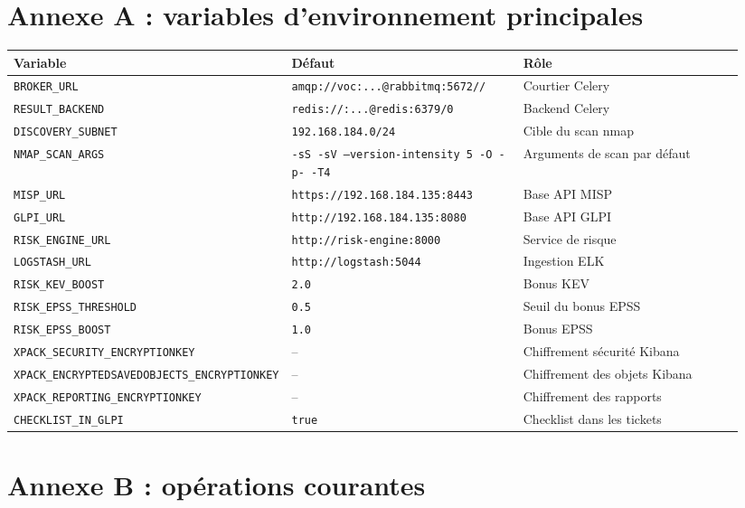 \section{Annexe A : variables d'environnement principales}

\begin{center}
\small
\begin{longtable}{@{}p{0.30\linewidth} p{0.32\linewidth} p{0.32\linewidth}@{}}
\toprule
\textbf{Variable} & \textbf{D\'efaut} & \textbf{R\^ole} \\
\midrule
\endhead
\bottomrule
\endlastfoot
\texttt{BROKER\_URL} & \texttt{amqp://voc:...@rabbitmq:5672//} & Courtier Celery \\
\texttt{RESULT\_BACKEND} & \texttt{redis://:...@redis:6379/0} & Backend Celery \\
\texttt{DISCOVERY\_SUBNET} & \texttt{192.168.184.0/24} & Cible du scan nmap \\
\texttt{NMAP\_SCAN\_ARGS} & \texttt{-sS -sV --version-intensity 5 -O -p- -T4} & Arguments de scan par d\'efaut \\
\texttt{MISP\_URL} & \texttt{https://192.168.184.135:8443} & Base API MISP \\
\texttt{GLPI\_URL} & \texttt{http://192.168.184.135:8080} & Base API GLPI \\
\texttt{RISK\_ENGINE\_URL} & \texttt{http://risk-engine:8000} & Service de risque \\
\texttt{LOGSTASH\_URL} & \texttt{http://logstash:5044} & Ingestion ELK \\
\texttt{RISK\_KEV\_BOOST} & \texttt{2.0} & Bonus KEV \\
\texttt{RISK\_EPSS\_THRESHOLD} & \texttt{0.5} & Seuil du bonus EPSS \\
\texttt{RISK\_EPSS\_BOOST} & \texttt{1.0} & Bonus EPSS \\
\texttt{XPACK\_SECURITY\_ENCRYPTIONKEY} & -- & Chiffrement s\'ecurit\'e Kibana \\
\texttt{XPACK\_ENCRYPTEDSAVEDOBJECTS\_ENCRYPTIONKEY} & -- & Chiffrement des objets Kibana \\
\texttt{XPACK\_REPORTING\_ENCRYPTIONKEY} & -- & Chiffrement des rapports \\
\texttt{CHECKLIST\_IN\_GLPI} & \texttt{true} & Checklist dans les tickets \\
\bottomrule
\end{longtable}
\end{center}

\section{Annexe B : op\'erations courantes}

